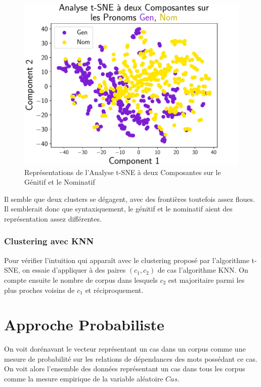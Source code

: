 \documentclass{cours}
\begin{document}
\begin{figure}[H]
\begin{minipage}{.5\textwidth}
	\begin{center}
	\includegraphics[width=\linewidth]{Figures/Visualisations/tsne_Gen_Nom_Pronouns.pdf}
	\end{center}
\end{minipage}
\caption{Représentations de l'Analyse t-SNE à deux Composantes sur le Génitif et le Nominatif}
\end{figure}

Il semble que deux clusters se dégagent, avec des frontières toutefois assez floues.
Il semblerait donc que syntaxiquement, le génitif et le nominatif aient des représentation assez différentes.

\subsubsection{Clustering avec KNN}
Pour vérifier l'intuition qui apparaît avec le clustering proposé par l'algorithme t-SNE, on essaie d'appliquer à des paires $(c_{1}, c_{2})$ de cas l'algorithme KNN.
On compte ensuite le nombre de corpus dans lesquels $c_{2}$ est majoritaire parmi les plus proches voisins de $c_{1}$ et réciproquement.



\newpage
\section{Approche Probabiliste}
On voit dorénavant le vecteur représentant un cas dans un corpus comme une mesure de probabilité sur les relations de dépendances des mots possédant ce cas.
On voit alors l'ensemble des données représentant un cas dans tous les corpus comme la mesure empirique de la variable aléatoire $Cas$.
\end{document}

